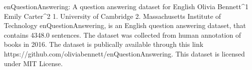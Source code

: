
enQuestionAnswering: A question answering dataset for English
Olivia Bennett^1 Emily Carter^2
1. University of Cambridge 2. Massachusetts Institute of Technology
enQuestionAnswering, is an English question answering dataset, that contains 4348.0 sentences.
The dataset was collected from human annotation of books in 2016. 
The dataset is publically available through this link https://github.com/oliviabennett/enQuestionAnswering. This dataset is licensed under MIT License.

